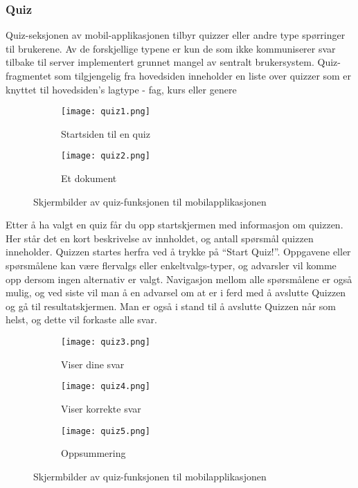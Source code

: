 \documentclass[../main.tex]{subfiles}
\begin{document}
\subsubsection{Quiz}

Quiz-seksjonen av mobil-applikasjonen tilbyr quizzer eller andre type spørringer til brukerene. Av de forskjellige typene er kun de som ikke kommuniserer svar tilbake til server implementert grunnet mangel av sentralt brukersystem.
Quiz-fragmentet som tilgjengelig fra hovedsiden inneholder en liste over quizzer som er knyttet til hovedsiden’s lagtype - fag, kurs eller genere

\begin{figure}[H]
        \centering
        \begin{subfigure}[b]{0.3\textwidth}
                \centering
                \texttt{[image: quiz1.png]}
                \caption{Startsiden til en quiz}
        \end{subfigure}
        \quad
        \begin{subfigure}[b]{0.3\textwidth}
                \centering
                \texttt{[image: quiz2.png]}
                \caption{Et dokument}
        \end{subfigure}
        \caption{Skjermbilder av quiz-funksjonen til mobilapplikasjonen}
\end{figure}

Etter å ha valgt en quiz får du opp startskjermen med informasjon om quizzen. Her står det en kort beskrivelse av innholdet, og antall spørsmål quizzen inneholder. Quizzen startes herfra ved å trykke på “Start Quiz!”.
Oppgavene eller spørsmålene kan være flervalgs eller enkeltvalgs-typer, og advarsler vil komme opp dersom ingen alternativ er valgt. Navigasjon mellom alle spørsmålene er også mulig, og ved siste vil man å en advarsel om at er i ferd med å avslutte Quizzen og gå til resultatskjermen. Man er også i stand til å avslutte Quizzen når som helst, og dette vil forkaste alle svar.

\begin{figure}[H]
        \centering
        \begin{subfigure}[b]{0.3\textwidth}
                \centering
                \texttt{[image: quiz3.png]}
                \caption{Viser dine svar}
        \end{subfigure}
        \quad
        \begin{subfigure}[b]{0.3\textwidth}
                \centering
                \texttt{[image: quiz4.png]}
                \caption{Viser korrekte svar}
        \end{subfigure}
        \quad
                \begin{subfigure}[b]{0.3\textwidth}
                        \centering
                        \texttt{[image: quiz5.png]}
                        \caption{Oppsummering}
                \end{subfigure}
        \caption{Skjermbilder av quiz-funksjonen til mobilapplikasjonen}
\end{figure}
\end{document}
